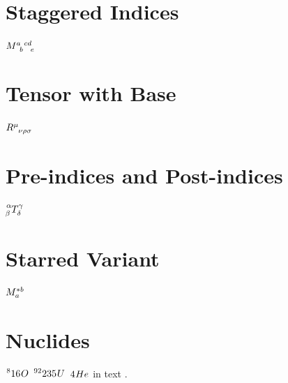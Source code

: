 \documentclass{article}
\begin{document}
\section{Staggered Indices}
$M\indices{^a_b^{cd}_e}$

\section{Tensor with Base}
$\tensor{R}{^\mu_{\nu\rho\sigma}}$

\section{Pre-indices and Post-indices}
$\tensor*[^\alpha_\beta]{T}{^\gamma_\delta}$

\section{Starred Variant}
$\tensor*{M}{^*_a^b}$

\section{Nuclides}
$\nuclide[8]{16}{O}$
$\nuclide[92]{235}{U}$
$\nuclide{4}{He}$
in text .
\end{document}
